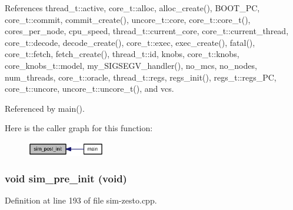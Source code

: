 References thread\_\-t::active, core\_\-t::alloc, alloc\_\-create(), BOOT\_\-PC, core\_\-t::commit, commit\_\-create(), uncore\_\-t::core, core\_\-t::core\_\-t(), cores\_\-per\_\-node, cpu\_\-speed, thread\_\-t::current\_\-core, core\_\-t::current\_\-thread, core\_\-t::decode, decode\_\-create(), core\_\-t::exec, exec\_\-create(), fatal(), core\_\-t::fetch, fetch\_\-create(), thread\_\-t::id, knobs, core\_\-t::knobs, core\_\-knobs\_\-t::model, my\_\-SIGSEGV\_\-handler(), no\_\-mcs, no\_\-nodes, num\_\-threads, core\_\-t::oracle, thread\_\-t::regs, regs\_\-init(), regs\_\-t::regs\_\-PC, core\_\-t::uncore, uncore\_\-t::uncore\_\-t(), and vcs.

Referenced by main().

Here is the caller graph for this function:\nopagebreak
\begin{figure}[H]
\begin{center}
\leavevmode
\includegraphics[width=96pt]{sim_8h_7af633ff74aee8f90ea9a610892191ce_icgraph}
\end{center}
\end{figure}
\subsubsection[{sim\_\-pre\_\-init}]{\setlength{\rightskip}{0pt plus 5cm}void sim\_\-pre\_\-init (void)}\label{sim_8h_6f8bfcc0d1d039d6fb378af082656f6f}




Definition at line 193 of file sim-zesto.cpp.

